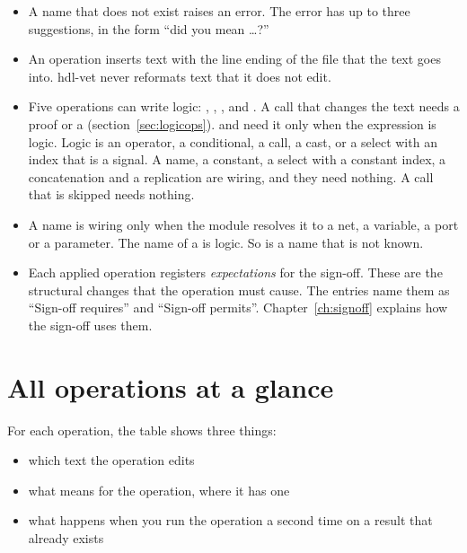 \begin{itemize}
  dict. Its lists are any collection of texts, such as a list, a set or a generator. One text,
  bytes and a mapping are no list. A name that is no text is refused too.
\item A name that does not exist raises an error. The error has up to three
  suggestions, in the form ``did you mean \ldots?''
\item An operation inserts text with the line ending of the file that the text goes
  into. hdl-vet never reformats text that it does not edit.
\item Five operations can write logic: ,
  , , 
  and . A call that changes the text needs a proof or a
   (section~\ref{sec:logicops}).  and
   need it only when the expression is logic. Logic is an
  operator, a conditional, a call, a cast, or a select with an index that is a signal. A name, a
  constant, a select with a constant index, a concatenation and a replication are wiring,
  and they need nothing. A call that is skipped needs nothing.
\item A name is wiring only when the module resolves it to a net, a variable, a port or a
  parameter. The name of a  is logic. So is a name that is not known.
\item Each applied operation registers \emph{expectations} for the sign-off. These are
  the structural changes that the operation must cause. The entries name them as
  ``Sign-off requires'' and ``Sign-off permits''. Chapter~\ref{ch:signoff} explains
  how the sign-off uses them.
\end{itemize}

\section{All operations at a glance}

For each operation, the table shows three things:

\begin{itemize}
\item which text the operation edits
\item what  means for the operation, where it has one
\item what happens when you run the operation a second time on a result that already
  exists
\end{itemize}

